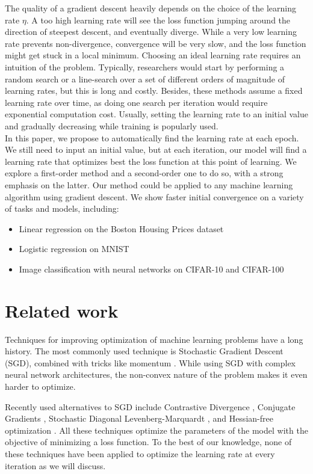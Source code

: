 \documentclass{article}
\begin{document}
  The quality of a gradient descent heavily depends on the choice of the learning rate $\eta$. A too high learning rate will see the loss function jumping around the direction of steepest descent, and eventually diverge. While a very low learning rate prevents non-divergence, convergence will be very slow, and the loss function might get stuck in a local minimum. Choosing an ideal learning rate requires an intuition of the problem. Typically, researchers would start by performing a random search or a line-search over a set of different orders of magnitude of learning rates, but this is long and costly. Besides, these methods assume a fixed learning rate over time, as doing one search per iteration would require exponential computation cost. Usually, setting the learning rate to an initial value and gradually decreasing while training is popularly used.\\
  
  In this paper, we propose to automatically find the learning rate at each epoch. We still need to input an initial value, but at each iteration, our model will find a learning rate that optimizes best the loss function at this point of learning. We explore a first-order method and a second-order one to do so, with a strong emphasis on the latter. Our method could be applied to any machine learning algorithm using gradient descent. We show faster initial convergence on a variety of tasks and models, including:
  \begin{itemize}
  	\item Linear regression on the Boston Housing Prices dataset
  	\item Logistic regression on MNIST
  	\item Image classification with neural networks on CIFAR-10 and CIFAR-100
  \end{itemize} 
  
  \section{Related work}
  
  Techniques for improving optimization of machine learning problems have a long history. The most commonly used technique is Stochastic Gradient Descent (SGD), combined with tricks like momentum \cite{polyak1964some}. While using SGD with complex neural network architectures, the non-convex nature of the problem makes it even harder to optimize. 
  
  Recently used alternatives to SGD include Contrastive Divergence \cite{hinton2006training}, Conjugate Gradients \cite{hinton2006reducing}, Stochastic Diagonal Levenberg-Marquardt \cite{lecun1998gradient}, and Hessian-free optimization \cite{martens2010deep}. All these techniques optimize the parameters of the model with the objective of minimizing a loss function. To the best of our knowledge, none of these techniques have been applied to optimize the learning rate at every iteration as we will discuss.
  
\end{document}
